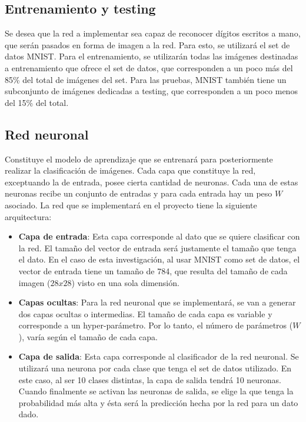 \documentclass[journal]{IEEEtran}
\begin{document}
\subsection{Entrenamiento y testing}
Se desea que la red a implementar sea capaz de reconocer dígitos escritos a mano, que serán pasados en forma de imagen a la red. Para esto, se utilizará el set de datos MNIST. Para el entrenamiento, se utilizarán todas las imágenes destinadas a entrenamiento que ofrece el set de datos, que corresponden a un poco más del 85\% del total de imágenes del set. Para las pruebas, MNIST también tiene un subconjunto de imágenes dedicadas a testing, que corresponden a un poco menos del 15\% del total.

\subsection{Red neuronal}
Constituye el modelo de aprendizaje que se entrenará para posteriormente realizar la clasificación de imágenes. Cada capa que constituye la red, exceptuando la de entrada, posee cierta cantidad de neuronas. Cada una de estas neuronas recibe un conjunto de entradas y para cada entrada hay un peso $W$ asociado. La red que se implementará en el proyecto tiene la siguiente arquitectura:

\begin{itemize}
    \item \textbf{Capa de entrada}: Esta capa corresponde al dato que se quiere clasificar con la red. El tamaño del vector de entrada será justamente el tamaño que tenga el dato. En el caso de esta investigación, al usar MNIST como set de datos, el vector de entrada tiene un tamaño de 784, que resulta del tamaño de cada imagen ($28x28$) visto en una sola  dimensión.
    \item \textbf{Capas ocultas}: Para la red neuronal que se implementará, se van a generar dos capas ocultas o intermedias. El tamaño de cada capa es variable y corresponde a un hyper-parámetro. Por lo tanto, el número de parámetros ($W$), varía según el tamaño de cada capa. 
    \item  \textbf{Capa de salida}: 
    Esta capa corresponde al clasificador de la red neuronal. Se utilizará una neurona por cada clase que tenga el set de datos utilizado. En este caso, al ser 10 clases distintas, la capa de salida tendrá 10 neuronas. Cuando finalmente se activan las neuronas de salida, se elige la que tenga la probabilidad más alta y ésta será la predicción hecha por la red para un dato dado.\\
\end{itemize}
\end{document}
